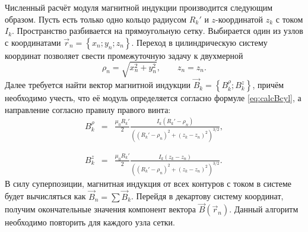 Численный расчёт модуля магнитной индукции производится следующим образом. Пусть есть только одно кольцо радиусом $R_k'$ и $z$-координатой $z_k$ с током $I_k$. Пространство разбивается на прямоугольную сетку. Выбирается один из узлов с координатами $\vec{r}_n = \left\{ x_n;y_n;z_n \right\}$. Переход в цилиндрическую систему координат позволяет свести промежуточную задачу к двухмерной 
\begin{equation}
	\rho_n = \sqrt{x_n^2 + y_n^2}, \qquad z_n = z_n.
\end{equation}
Далее требуется найти вектор магнитной индукции $\vec{B}_k = \left\{ B^{\rho}_k; B_k^z \right\}$, причём необходимо учесть, что её модуль определяется согласно формуле \eqref{eq:calcBcyl}, а направление согласно правилу правого винта:
\begin{eqnarray}
	B^{\rho}_k &=& \frac{\mu_0 R_k'}{2} \frac{I_k \left( R_k' - \rho_n \right)}{\left( \left( R_k' - \rho_n \right)^2 + \left( z_k - z_n \right)^2 \right)^{3/2}}, \\ \nonumber \\ \nonumber \\
	B^{z}_k &=& \frac{\mu_0 R_k'}{2} \frac{I_k \left( z_k - z_n \right)}{\left( \left( R_k' - \rho_n \right)^2 + \left( z_k - z_n \right)^2 \right)^{3/2}}.
\end{eqnarray}
В силу суперпозиции, магнитная индукция от всех контуров с током в системе будет вычисляться как $\vec{B}_n = \sum \vec{B}_k$. Перейдя в декартову систему координат, получим окончательные значения компонент вектора $\vec{B}(\vec{r}_n)$. Данный алгоритм необходимо повторить для каждого узла сетки.

